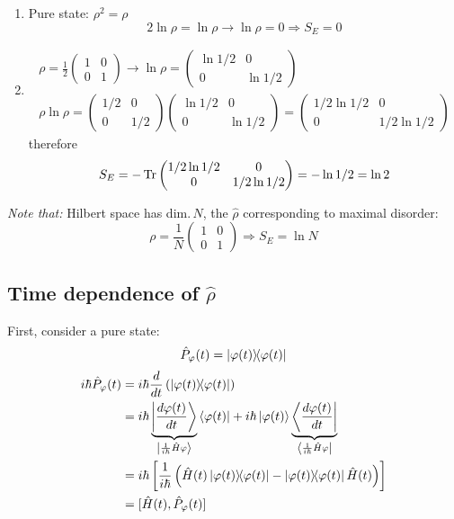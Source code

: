 \documentclass[12pt]{article}
\newcommand{\be}{\begin{equation}}
\newcommand{\ee}{\end{equation}}
\begin{document}
\begin{enumerate}
\item Pure state: $\rho^2 = \rho$
\be
2\ln\rho = \ln\rho \to \ln\rho = 0  \Rightarrow S_E = 0
\ee
\item %
\[
\begin{gathered}
\rho        = \frac{1}{2}\begin{pmatrix}1 & 0\\0 & 1\end{pmatrix} \to
\ln\rho     = \begin{pmatrix}\ln 1/2 & 0\\0 & \ln1/2\end{pmatrix}\\
\rho\ln\rho = \begin{pmatrix}1/2 & 0\\0 & 1/2\end{pmatrix} 
\begin{pmatrix}\ln 1/2 & 0\\0 & \ln1/2\end{pmatrix} = 
\begin{pmatrix}1/2 \ln 1/2 & 0\\0 & 1/2 \ln1/2\end{pmatrix}
\end{gathered}
\]
therefore
\be
S_E = -\Tr\begin{pmatrix}1/2 \ln 1/2 & 0\\0 & 1/2 \ln 1/2\end{pmatrix} = -\ln1/2 =\ln2
\ee
\end{enumerate}

\emph{Note that:} Hilbert space has dim.\,$N$, the
$\hat{\rho}$ corresponding to maximal disorder:
\be
\rho        = \frac{1}{N}\begin{pmatrix}1 & 0\\0 & 1\end{pmatrix} \Rightarrow S_E = \ln N
\ee

\subsection{Time dependence of $\hat{\rho}$}

\setcounter{equation}{64}
First, consider a pure state:
\be
\hat{P}_\varphi(t) = \op{\varphi(t)}
\ee
%
\be
\begin{aligned}
i\hbar\hat{P}_\varphi(t)
&=i\hbar\frac{d}{dt}\left(\op{\varphi(t)}\right)\\
&=i\hbar\underbrace{\ket{\frac{d\varphi(t)}{dt}}}%
_{\ket{\frac{1}{i\hbar}\hat{H}\varphi}}
\bra{\varphi(t)} + 
  i\hbar\ket{\varphi(t)}\underbrace{\bra{\frac{d\varphi(t)}{dt}}}%
_{\bra{\frac{1}{i\hbar}\hat{H}\varphi}}\\
&= i\hbar\left[
\frac{1}{i\hbar}
\left(
\hat{H}(t)\op{\varphi(t)} - \op{\varphi(t)}\hat{H}(t) 
\right)
\right]\\
&=[\hat{H}(t),\hat{P}_\varphi(t)]
\end{aligned}
\ee
\end{document}
